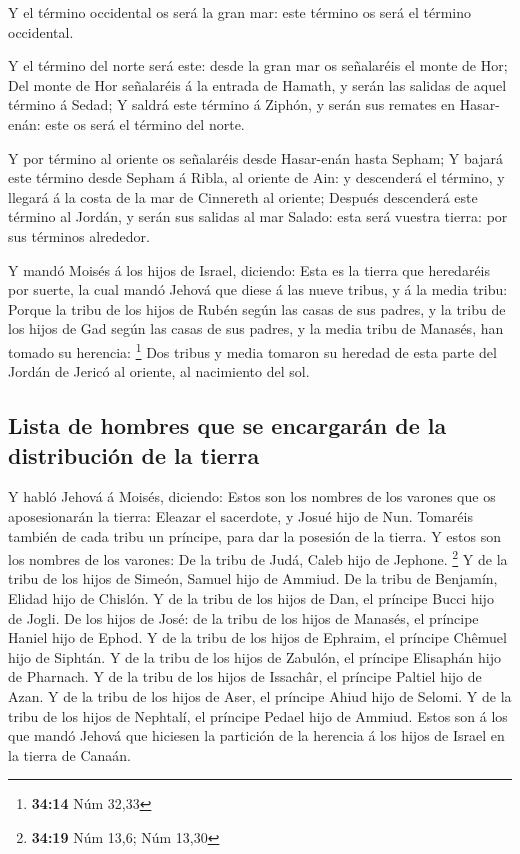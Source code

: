  Y el término occidental os será la gran mar: este término
os será el término occidental.

 Y el término del norte será este: desde la gran mar os
señalaréis el monte de Hor;  Del monte de Hor señalaréis á
la entrada de Hamath, y serán las salidas de aquel término á Sedad;
 Y saldrá este término á Ziphón, y serán sus remates en
Hasar-enán: este os será el término del norte.

 Y por término al oriente os señalaréis desde Hasar-enán
hasta Sepham;  Y bajará este término desde Sepham á
Ribla, al oriente de Ain: y descenderá el término, y llegará á la costa
de la mar de Cinnereth al oriente;  Después descenderá
este término al Jordán, y serán sus salidas al mar Salado: esta será
vuestra tierra: por sus términos alrededor.

 Y mandó Moisés á los hijos de Israel, diciendo: Esta es
la tierra que heredaréis por suerte, la cual mandó Jehová que diese á
las nueve tribus, y á la media tribu:  Porque la tribu de
los hijos de Rubén según las casas de sus padres, y la tribu de los
hijos de Gad según las casas de sus padres, y la media tribu de Manasés,
han tomado su herencia: \footnote{\textbf{34:14} Núm 32,33}
 Dos tribus y media tomaron su heredad de esta parte del
Jordán de Jericó al oriente, al nacimiento del sol.

\hypertarget{lista-de-hombres-que-se-encargaruxe1n-de-la-distribuciuxf3n-de-la-tierra}{%
\subsection{Lista de hombres que se encargarán de la distribución de la
tierra}\label{lista-de-hombres-que-se-encargaruxe1n-de-la-distribuciuxf3n-de-la-tierra}}

 Y habló Jehová á Moisés, diciendo:  Estos
son los nombres de los varones que os aposesionarán la tierra: Eleazar
el sacerdote, y Josué hijo de Nun.  Tomaréis también de
cada tribu un príncipe, para dar la posesión de la tierra.
 Y estos son los nombres de los varones: De la tribu de
Judá, Caleb hijo de Jephone. \footnote{\textbf{34:19} Núm 13,6; Núm
  13,30}  Y de la tribu de los hijos de Simeón, Samuel
hijo de Ammiud.  De la tribu de Benjamín, Elidad hijo de
Chislón.  Y de la tribu de los hijos de Dan, el príncipe
Bucci hijo de Jogli.  De los hijos de José: de la tribu
de los hijos de Manasés, el príncipe Haniel hijo de Ephod.
 Y de la tribu de los hijos de Ephraim, el príncipe
Chêmuel hijo de Siphtán.  Y de la tribu de los hijos de
Zabulón, el príncipe Elisaphán hijo de Pharnach.  Y de la
tribu de los hijos de Issachâr, el príncipe Paltiel hijo de Azan.
 Y de la tribu de los hijos de Aser, el príncipe Ahiud
hijo de Selomi.  Y de la tribu de los hijos de Nephtalí,
el príncipe Pedael hijo de Ammiud.  Estos son á los que
mandó Jehová que hiciesen la partición de la herencia á los hijos de
Israel en la tierra de Canaán.

